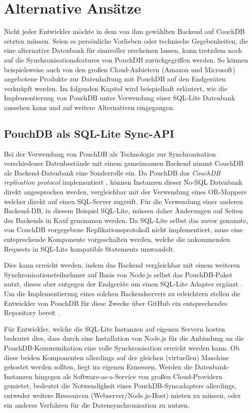 \chapter{Alternative Ansätze}
\label{Alternative Ansätze}

Nicht jeder Entwickler möchte in dem von ihm gewählten Backend auf CouchDB setzten müssen. Seien es persönliche Vorlieben oder technische Gegebenheiten, die eine alternative Datenbank für sinnvoller erscheinen lassen, kann trotzdem noch auf die Synchronisationsfeatures von PouchDB zurückgegriffen werden. So können beispielsweise auch von den großen Cloud-Anbietern (Amazon und Microsoft) angebotene Produkte zur Datenhaltung mit PouchDB auf den Endgeräten verknüpft werden. Im folgenden Kapitel wird beispielhaft erläutert, wie die Implementierung von PouchDB unter Verwendung einer SQL-Lite Datenbank aussehen kann und auf weitere Alternativen eingegangen.

\section{PouchDB als SQL-Lite Sync-API}
Bei der Verwendung von PouchDB als Technologie zur Synchronisation verschiedener Datenbestände mit einem gemeinsamen Backend nimmt CouchDB als Backend-Datenbank eine Sonderrolle ein. Da PouchDB das \emph{CouchDB replication protocol} implementiert \cite{pouch:syncnoncouchdb}, können Instanzen dieser No-SQL Datenbank direkt angesprochen werden, vergleichbar mit der Verwendung eines OR-Mappers welcher direkt auf einen SQL-Server zugreift. Für die Verwendung einer anderen Backend-DB, in diesem Beispiel SQL-Lite, müssen daher Änderungen auf Seiten des Backends in Kauf genommen werden. Da SQL-Lite selbst das zuvor genannte, von CouchDB vorgegebene Replikationsprotokoll nicht implementiert, muss eine entsprechende Komponente vorgeschalten werden, welche die ankommenden Requests in SQL-Lite kompatible Statements umwandelt.

Dies kann erreicht werden, indem das Backend vergleichbar mit einem weiteren Synchronisationsteilnehmer auf Basis von Node.js selbst das PouchDB-Paket nutzt, dieses aber entgegen der Endgeräte um einen SQL-Lite Adapter ergänzt \cite{pouch:sqlliteplugin}. Um die Implementierung eines solchen Backendservers zu erleichtern stellen die Entwickler von PouchDB für diese Zwecke über GitHub ein entsprechendes Repository bereit \cite{pouch:pouchdbserver}.

Für Entwickler, welche die SQL-Lite Instanzen auf eigenen Servern hosten bedeutet dies, dass durch eine Installation von Node.js für die Anbindung an die PouchDB-Kommunikation eine volle Synchronisation erreicht werden kann. Ob diese beiden Komponenten allerdings auf der gleichen (virtuellen) Maschine gehostet werden sollten, liegt im eigenen Ermessen. Werden die Datenbank-Instanzen hingegen als Software-as-a-Service von großen Cloud-Providern gemietet, bedeutet die Notwendigkeit eines PouchDB-Syncadapters allerdings, entweder weitere Ressourcen (Webserver/Node.js-Host) mieten zu müssen, oder ein anderes Verfahren für die Datensynchronisation zu nutzen.

